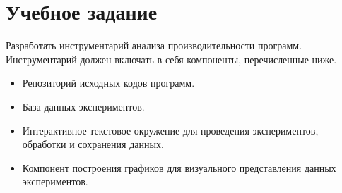\section*{Учебное задание}
Разработать инструментарий анализа производительности программ. Инструментарий должен включать в себя компоненты, перечисленные ниже.
\begin{itemize}
    \item Репозиторий исходных кодов программ.
    \item База данных экспериментов.
    \item Интерактивное текстовое окружение для проведения экспериментов, обработки и сохранения данных.
    \item Компонент построения графиков для визуального представления данных экспериментов.
\end{itemize}